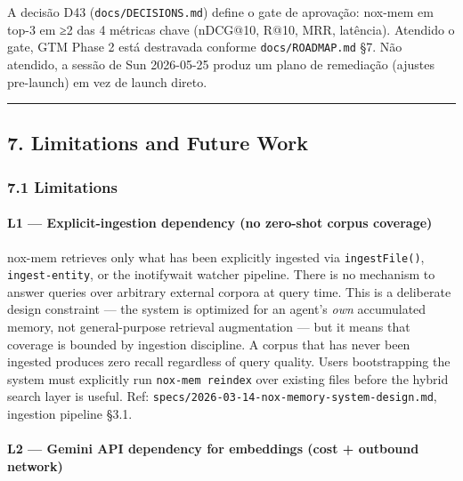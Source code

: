 \documentclass[
]{article}
\begin{document}
A decisão D43 (\texttt{docs/DECISIONS.md}) define o gate de aprovação:
nox-mem em top-3 em ≥2 das 4 métricas chave (nDCG@10, R@10, MRR,
latência). Atendido o gate, GTM Phase 2 está destravada conforme
\texttt{docs/ROADMAP.md} §7. Não atendido, a sessão de Sun 2026-05-25
produz um plano de remediação (ajustes pre-launch) em vez de launch
direto.

\begin{center}\rule{0.5\linewidth}{0.5pt}\end{center}

\subsection{7. Limitations and Future
Work}\label{limitations-and-future-work}

\subsubsection{7.1 Limitations}\label{limitations}

\paragraph{L1 --- Explicit-ingestion dependency (no zero-shot corpus
coverage)}\label{l1-explicit-ingestion-dependency-no-zero-shot-corpus-coverage}

nox-mem retrieves only what has been explicitly ingested via
\texttt{ingestFile()}, \texttt{ingest-entity}, or the inotifywait
watcher pipeline. There is no mechanism to answer queries over arbitrary
external corpora at query time. This is a deliberate design constraint
--- the system is optimized for an agent's \emph{own} accumulated
memory, not general-purpose retrieval augmentation --- but it means that
coverage is bounded by ingestion discipline. A corpus that has never
been ingested produces zero recall regardless of query quality. Users
bootstrapping the system must explicitly run \texttt{nox-mem\ reindex}
over existing files before the hybrid search layer is useful. Ref:
\texttt{specs/2026-03-14-nox-memory-system-design.md}, ingestion
pipeline §3.1.

\paragraph{L2 --- Gemini API dependency for embeddings (cost + outbound
network)}\label{l2-gemini-api-dependency-for-embeddings-cost-outbound-network}
\end{document}
